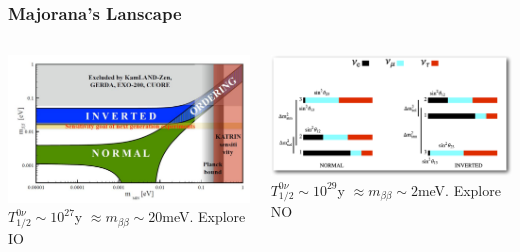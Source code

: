 \begin{frame}
\frametitle{Majorana's Lanscape}
\begin{columns}
\includegraphics[scale=0.35]{img/doublebetas.jpg}
$T_{1/2}^{0\nu} \sim 10^{27}$y  $\approx m_{\beta\beta} \sim 20$meV. \alert{Explore IO}

\includegraphics[scale=0.25]{img/nuhierarchies.png}
$T_{1/2}^{0\nu} \sim 10^{29}$y  $\approx m_{\beta\beta} \sim 2$meV. \alert{Explore NO}
\end{columns}


\end{frame}



